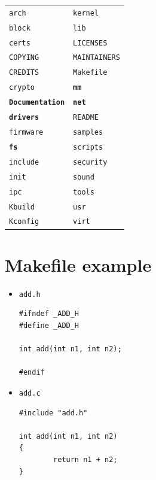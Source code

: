 \documentclass{beamer}
\begin{document}
\begin{frame}[fragile]
  \begin{tabular}{ll}
    \texttt{arch} & \texttt{kernel} \\
    \texttt{block} & \texttt{lib} \\
    \texttt{certs} & \texttt{LICENSES} \\
    \texttt{COPYING} & \texttt{MAINTAINERS} \\
    \texttt{CREDITS} & \texttt{Makefile} \\
    \texttt{crypto} & \textbf{\texttt{mm}} \\
    \textbf{\texttt{Documentation}} & \textbf{\texttt{net}} \\
    \textbf{\texttt{drivers}} & \texttt{README} \\
    \texttt{firmware} & \texttt{samples} \\
    \textbf{\texttt{fs}} & \texttt{scripts} \\
    \texttt{include} & \texttt{security} \\
    \texttt{init} & \texttt{sound} \\
    \texttt{ipc} & \texttt{tools} \\
    \texttt{Kbuild} & \texttt{usr} \\
    \texttt{Kconfig} & \texttt{virt} \\
  \end{tabular}
\end{frame}

\section{Makefile example}
\label{sec:makefiles}

\begin{frame}[fragile]
  \begin{itemize}
  \item \texttt{add.h}
\begin{lstlisting}
#ifndef _ADD_H
#define _ADD_H

int add(int n1, int n2);

#endif
\end{lstlisting}
  \item \texttt{add.c}
\begin{lstlisting}
#include "add.h"

int add(int n1, int n2)
{
        return n1 + n2;
}
\end{lstlisting}
  \end{itemize}
\end{frame}
\end{document}
